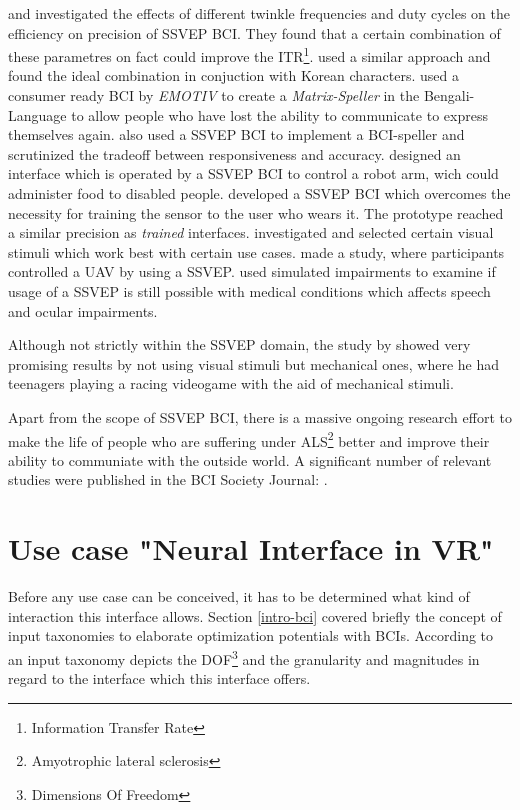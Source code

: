             \cite{Oralhan.2016} and \cite{Resalat.2011} investigated the effects of different twinkle frequencies and duty cycles on the efficiency on precision of SSVEP BCI. They found that a certain combination of these parametres on fact could improve the ITR\footnote{Information Transfer Rate}. \cite{Lee.2016} used a similar approach and found the ideal combination in conjuction with Korean characters.
            \cite{S.M.Abdullah.2014} used a consumer ready BCI by \textit{EMOTIV} to create a \textit{Matrix-Speller} in the Bengali-Language to allow people who have lost the ability to communicate to express themselves again. 
            \cite{Chen.2020} also used a SSVEP BCI to implement a BCI-speller and scrutinized the tradeoff between responsiveness and accuracy.
            \cite{Chen.2020} designed an interface which is operated by a SSVEP BCI to control a robot arm, wich could administer food to disabled people.
            \cite{Soroush.2018} developed a SSVEP BCI which overcomes the necessity for training the sensor to the user who wears it. The prototype reached a similar precision as \textit{trained} interfaces.
            \cite{Gergondet.2015} investigated and selected certain visual stimuli which work best with certain use cases.
            \cite{Merino.2017} made a study, where participants controlled a UAV by using a SSVEP.
            \cite{Peters.2018} used simulated impairments to examine if usage of a SSVEP is still possible with medical conditions which affects speech and ocular impairments.

            Although not strictly within the SSVEP domain, the study by \cite{Beveridge.2017} showed very promising results by not using visual stimuli but mechanical ones, where he had teenagers playing a racing videogame with the aid of mechanical stimuli.

            Apart from the scope of SSVEP BCI, there is a massive ongoing research effort to make the life of people who are suffering under ALS\footnote{Amyotrophic lateral sclerosis} better and improve their ability to communiate with the outside world.
            A significant number of relevant studies were published in the BCI Society Journal: .


        \section{Use case "Neural Interface in VR"}\label{use-case}

            Before any use case can be conceived, it has to be determined what kind of interaction this interface allows. Section \ref*{intro-bci} covered briefly the concept of input taxonomies to elaborate optimization potentials with BCIs. According to  an input taxonomy depicts the DOF\footnote{Dimensions Of Freedom} and the granularity and magnitudes in regard to the interface which this interface offers.

